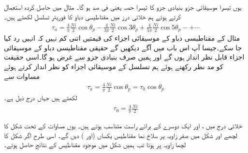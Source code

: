 یوں تیسرا موسیقائی جزو بنیادی جزو کا تیسرا حصہ یعنی  فی صد ہو گا۔
%
مثال  میں حاصل کردہ   استعمال کرتے ہوئے  ہم خلائی درز میں مقناطیسی دباو  کا فوریئر تسلسل لکھتے ہیں۔
\begin{align}\label{مساوات_تبادلہ_توانائی_فوریئر_متقناطیسی_دباو_تسلسل}
\tau_a=\frac{4}{\pi}\frac{Ni}{2} \cos \theta_p-\frac{4}{3\pi}\frac{Ni}{2} \cos 3\theta_p+\frac{4}{5\pi}\frac{Ni}{2} \cos 5\theta_p-+\cdots
\end{align}
مثال  کے مقناطیسی دباو کے موسیقائی اجزاء  کی قیمتیں اتنی کم نہیں کہ انہیں رد کیا جا سکے۔جیسا آپ اس باب میں آگے دیکھیں گے حقیقی  مقناطیسی دباو کے موسیقائی اجزاء قابل نظر انداز ہوں گے اور ہمیں صرف بنیادی جزو  سے غرض ہو گا۔اسی حقیقت کو مد نظر رکھتے ہوئے ہم  تسلسل کے موسیقائی اجزاء کو نظر انداز کرتے ہوئے  مساوات  سے
\begin{align}\label{مساوات_گھومتے_مشین_پھیلا_سائن_نما}
\tau_{a}=\frac{4}{\pi}\frac{Ni}{2} \cos \theta_p=\tau_0 \cos \theta_p
\end{align}
لکھتے ہیں جہاں  درج ذیل ہے۔
\begin{align}\label{مساوات_گھومتے_مشین_دباو_چوٹی}
\tau_0=\frac{4}{\pi}\frac{Ni}{2} 
\end{align}

خلائی درج میں ،  اور  ایک دوسرے کے برائے راست متناسب ہوتے ہیں۔ یوں 
مساوات  کے تحت  شکل   کا لچھے اور  شکل   میں  صفر زاویہ پر سلاخ نما مقناطیس یکساں  (اور ) دیں گے۔ اسی طرح اگر شکل   کا لچھا  زاویہ   پر  ہوتا تب ہمیں  شکل   میں موجود مقناطیس کے نتائج حاصل ہوتے۔

